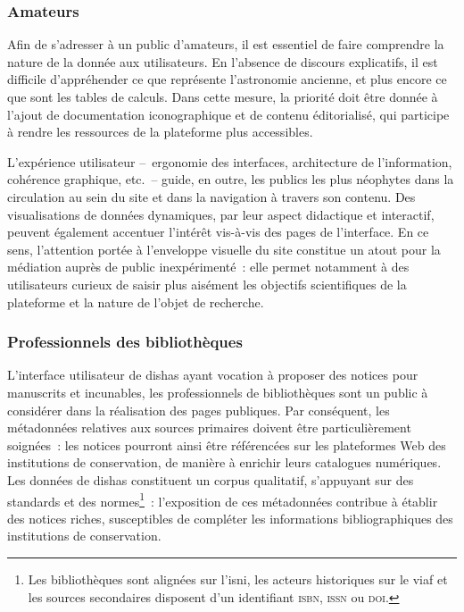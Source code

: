 \documentclass[a4paper,12pt,twoside]{book}
\newcommand{\dishas}{\gls{dishas}\xspace}
\newcommand{\viaf}{\gls{viaf}\xspace}
\newcommand{\isni}{\gls{isni}\xspace}
\begin{document}
			\subsubsection{Amateurs}
Afin de s'adresser à un public d'amateurs, il est essentiel de faire comprendre la nature de la donnée aux utilisateurs. En l'absence de discours explicatifs, il est difficile d'appréhender ce que représente l'astronomie ancienne, et plus encore ce que sont les tables de calculs. Dans cette mesure, la priorité doit être donnée à l'ajout de documentation iconographique et de contenu éditorialisé, qui participe à rendre les ressources de la plateforme plus accessibles.

L'expérience utilisateur –~ergonomie des interfaces, architecture de l'information, cohérence graphique, etc.~– guide, en outre, les publics les plus néophytes dans la circulation au sein du site et dans la navigation à travers son contenu. Des visualisations de données dynamiques, par leur aspect didactique et interactif, peuvent également accentuer l'intérêt vis-à-vis des pages de l'interface. En ce sens, l'attention portée à l'enveloppe visuelle du site constitue un atout pour la médiation auprès de public inexpérimenté~: elle permet notamment à des utilisateurs curieux de saisir plus aisément les objectifs scientifiques de la plateforme et la nature de l'objet de recherche.

			\subsubsection{Professionnels des bibliothèques}
L'interface utilisateur de \dishas ayant vocation à proposer des notices pour manuscrits et incunables, les professionnels de bibliothèques sont un public à considérer dans la réalisation des pages publiques. Par conséquent, les métadonnées relatives aux sources primaires doivent être particulièrement soignées~: les notices pourront ainsi être référencées sur les plateformes Web des institutions de conservation, de manière à enrichir leurs catalogues numériques. Les données de \dishas constituent un corpus qualitatif, s'appuyant sur des standards et des normes\footnote{Les bibliothèques sont alignées sur l'\isni, les acteurs historiques sur le \viaf et les sources secondaires disposent d'un identifiant \textsc{isbn}, \textsc{issn} ou \textsc{doi}.}~: l'exposition de ces métadonnées contribue à établir des notices riches, susceptibles de compléter les informations bibliographiques des institutions de conservation.
\end{document}
